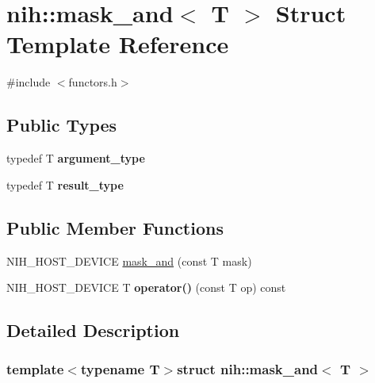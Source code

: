 \hypertarget{structnih_1_1mask__and}{
\section{nih\-:\-:mask\-\_\-and$<$ \-T $>$ \-Struct \-Template \-Reference}
\label{structnih_1_1mask__and}
}


{\ttfamily \#include $<$functors.\-h$>$}

\subsection*{\-Public \-Types}
\begin{DoxyCompactItemize}
\item 
\hypertarget{structnih_1_1mask__and_a9b687992d00fb390d5f93b66fdb40dd9}{
typedef \-T {\bfseries argument\-\_\-type}}
\label{structnih_1_1mask__and_a9b687992d00fb390d5f93b66fdb40dd9}

\item 
\hypertarget{structnih_1_1mask__and_a953debe44ff4c6f2e70714c8791ec27a}{
typedef \-T {\bfseries result\-\_\-type}}
\label{structnih_1_1mask__and_a953debe44ff4c6f2e70714c8791ec27a}

\end{DoxyCompactItemize}
\subsection*{\-Public \-Member \-Functions}
\begin{DoxyCompactItemize}
\item 
\-N\-I\-H\-\_\-\-H\-O\-S\-T\-\_\-\-D\-E\-V\-I\-C\-E \hyperlink{structnih_1_1mask__and_a2cc54e380c76676bb4aa30966971eed7}{mask\-\_\-and} (const \-T mask)
\item 
\hypertarget{structnih_1_1mask__and_a785745290602e5ceed6bfed1d5e1c525}{
\-N\-I\-H\-\_\-\-H\-O\-S\-T\-\_\-\-D\-E\-V\-I\-C\-E \-T {\bfseries operator()} (const \-T op) const }
\label{structnih_1_1mask__and_a785745290602e5ceed6bfed1d5e1c525}

\end{DoxyCompactItemize}


\subsection{\-Detailed \-Description}
\subsubsection*{template$<$typename T$>$struct nih\-::mask\-\_\-and$<$ T $>$}

